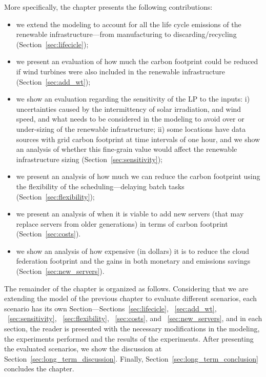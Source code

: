 More specifically, the chapter presents the following contributions:

\begin{itemize}
 
\item we extend the modeling to account for all the life cycle emissions of the renewable infrastructure---from manufacturing to discarding/recycling (Section~\ref{sec:lifecicle});
\item we present an evaluation of how much the carbon footprint could be reduced if wind turbines were also included in the renewable infrastructure   (Section~\ref{sec:add_wt});
\item we show an evaluation regarding the sensitivity of the LP to the inputs: i) uncertainties caused by the intermittency of solar irradiation, and wind speed, and what needs to be considered in the modeling to avoid over or under-sizing of the renewable infrastructure; ii) some locations have data sources with grid carbon footprint at time intervals of one hour, and we show an analysis of whether this fine-grain value would affect the renewable infrastructure sizing  (Section~\ref{sec:sensitivity});
\item we present an analysis of how much we can reduce the carbon footprint using the flexibility of the scheduling---delaying batch tasks (Section~\ref{sec:flexibility});
\item we present an analysis of when it is viable to add new servers (that may replace servers from older generations) in terms of carbon footprint  (Section~\ref{sec:costs}).
\item we show an analysis of how expensive (in dollars) it is to reduce the cloud federation footprint and the gains in both monetary and emissions savings (Section~\ref{sec:new_servers}).
  
\end{itemize}


The remainder of the chapter is organized as follows. Considering that we are extending the model of the previous chapter to evaluate different scenarios, each scenario has its own Section---Sections~\ref{sec:lifecicle}, ~\ref{sec:add_wt}, ~\ref{sec:sensitivity}, ~\ref{sec:flexibility}, ~\ref{sec:costs}, and  ~\ref{sec:new_servers}, and in each section, the reader is presented with the necessary modifications in the modeling, the experiments performed and the results of the experiments. After presenting the evaluated scenarios, we show the discussion at Section~\ref{sec:long_term_discussion}. Finally, Section~\ref{sec:long_term_conclusion} concludes the chapter.



